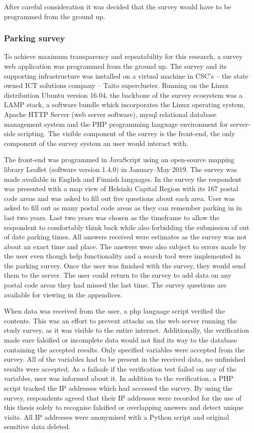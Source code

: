 After careful consideration it was decided that the survey would have to be programmed from the ground up.

\subsubsection{Parking survey}
\justify
To achieve maximum transparency and repeatability for this research, a survey web application was programmed from the ground up. The survey and its supporting infrastructure was installed on a virtual machine in CSC's -- the state owned ICT solutions company -- Taito supercluster. Running on the Linux distribution Ubuntu version 16.04, the backbone of the survey ecosystem was a LAMP stack, a software bundle which incorporates the Linux operating system, Apache HTTP Server (web server software), \gls{mysql} relational database management system and the PHP programming language environment for server-side scripting. The visible component of the survey is the front-end, the only component of the survey system an user would interact with.

The front-end was programmed in JavaScript using an open-source mapping library Leaflet (software version 1.4.0) in January--May 2019. The survey was made available in English and Finnish languages. In the survey the respondent was presented with a map view of Helsinki Capital Region with its 167 postal code areas and was asked to fill out five questions about each area. User was asked to fill out as many postal code areas as they can remember parking in in last two years. Last two years was chosen as the timeframe to allow the respondent to comfortably think back while also forbidding the submission of out of date parking times. All answers received were estimates as the survey was not about an exact time and place. The answers were also subject to errors made by the user even though help functionality and a search tool were implemented in the parking survey. Once the user was finished with the survey, they would send them to the server. The user could return to the survey to add data on any postal code areas they had missed the last time. The survey questions are available for viewing in the appendices.

When data was received from the user, a \gls{php} language script verified the contents. This was an effort to prevent attacks on the web server running the study survey, as it was visible to the entire internet. Additionally, the verification made sure falsified or incomplete data would not find its way to the database containing the accepted results. Only specified variables were accepted from the survey. All of the variables had to be present in the received data, no unfinished results were accepted. As a failsafe if the verification test failed on any of the variables, user was informed about it. In addition to the verification, a PHP script tracked the IP addresses which had accessed the survey. By using the survey, respondents agreed that their IP addresses were recorded for the use of this thesis solely to recognise falsified or overlapping answers and detect unique visits. All IP addresses were anonymised with a Python script and original sensitive data deleted.

